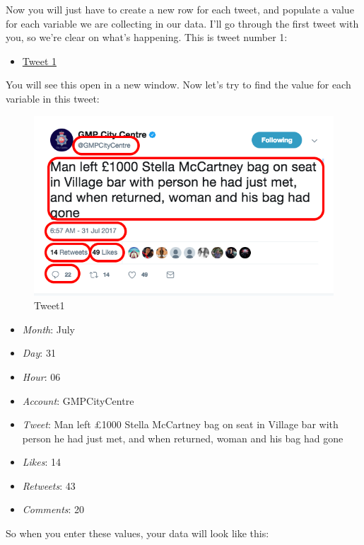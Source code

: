 \documentclass[]{book}
\providecommand{\tightlist}{%
  \setlength{\itemsep}{0pt}\setlength{\parskip}{0pt}}
\theoremstyle{definition}
\theoremstyle{definition}
\theoremstyle{definition}
\theoremstyle{remark}
\begin{document}
Now you will just have to create a new row for each tweet, and populate
a value for each variable we are collecting in our data. I'll go through
the first tweet with you, so we're clear on what's happening. This is
tweet number 1:

\begin{itemize}
\tightlist
\item
  \href{https://twitter.com/GMPCityCentre/status/891900693585506304}{Tweet
  1}
\end{itemize}

You will see this open in a new window. Now let's try to find the value
for each variable in this tweet:

\begin{figure}
\centering
\includegraphics{imgs/tweet1.png}
\caption{Tweet1}
\end{figure}

\begin{itemize}
\tightlist
\item
  \emph{Month}: July
\item
  \emph{Day}: 31
\item
  \emph{Hour}: 06
\item
  \emph{Account}: GMPCityCentre
\item
  \emph{Tweet}: Man left £1000 Stella McCartney bag on seat in Village
  bar with person he had just met, and when returned, woman and his bag
  had gone
\item
  \emph{Likes}: 14
\item
  \emph{Retweets}: 43
\item
  \emph{Comments}: 20
\end{itemize}

So when you enter these values, your data will look like this:
\end{document}
